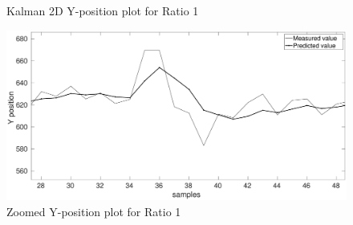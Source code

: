 \documentclass[12pt]{article}
\begin{document}
\begin{figure}[ht!]
\begin{minipage}{0.5\textwidth}
	\caption{Kalman 2D Y-position plot for Ratio 1}
	\label{fig:kalman 2D YRat1}
\end{minipage}%
\begin{minipage}{0.5\textwidth}
\centering
	\includegraphics[width = \textwidth]{./Figures/part2Ratio1Yzoomed.eps}
	\caption{ Zoomed Y-position plot for Ratio 1}
	\label{fig: kalman 2D YRat1 zoom}
\end{minipage}
\end{figure}
\end{document}
